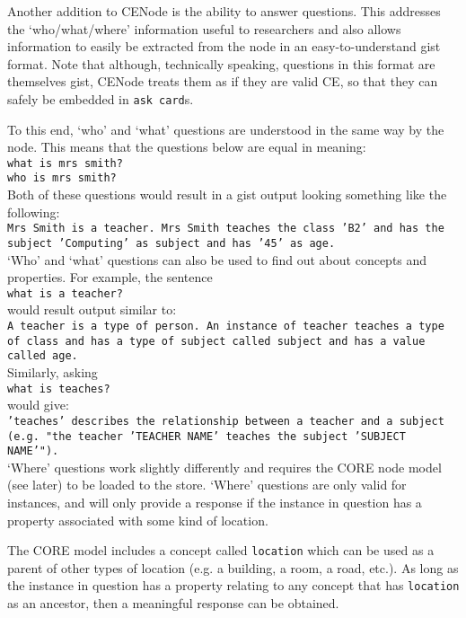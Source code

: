 \documentclass{scrartcl}
\begin{document}
Another addition to CENode is the ability to answer questions. This addresses the `who/what/where' information useful to researchers and also allows information to easily be extracted from the node in an easy-to-understand gist format. Note that although, technically speaking, questions in this format are themselves gist, CENode treats them as if they are valid CE, so that they can safely be embedded in \texttt{ask card}s.

To this end, `who' and `what' questions are understood in the same way by the node. This means that the questions below are equal in meaning:\\
\texttt{what is mrs smith?}\\
\texttt{who is mrs smith?}\\

Both of these questions would result in a gist output looking something like the following:\\
\texttt{Mrs Smith is a teacher. Mrs Smith teaches the class 'B2' and has the subject 'Computing' as subject and has '45' as age.}\\

`Who' and `what' questions can also be used to find out about concepts and properties. For example, the sentence\\
\texttt{what is a teacher?}\\
would result output similar to:\\
\texttt{A teacher is a type of person. An instance of teacher teaches a type of class and has a type of subject called subject and has a value called age.}\\

Similarly, asking\\
\texttt{what is teaches?}\\
would give:\\
\texttt{'teaches' describes the relationship between a teacher and a subject (e.g. "the teacher 'TEACHER NAME' teaches the subject 'SUBJECT NAME'").}\\

`Where' questions work slightly differently and requires the CORE node model (see later) to be loaded to the store. `Where' questions are only valid for instances, and will only provide a response if the instance in question has a property associated with some kind of location.

The CORE model includes a concept called \texttt{location} which can be used as a parent of other types of location (e.g. a building, a room, a road, etc.). As long as the instance in question has a property relating to any concept that has \texttt{location} as an ancestor, then a meaningful response can be obtained.\\
\end{document}
